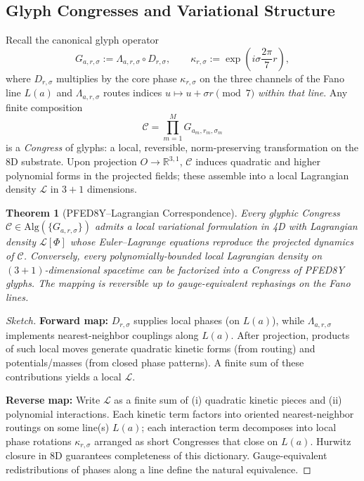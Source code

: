 \documentclass[pdflatex,sn-mathphys-num]{sn-jnl}
\theoremstyle{thmstyleone}
\newtheorem{theorem}{Theorem}
\theoremstyle{thmstyletwo}
\theoremstyle{thmstylethree}
\begin{document}
\subsection{Glyph Congresses and Variational Structure}

Recall the canonical glyph operator
\begin{equation}
    G_{a,r,\sigma} := \Lambda_{a,r,\sigma} \circ D_{r,\sigma}, \qquad
    \kappa_{r,\sigma} := \exp\left(i\sigma\frac{2\pi}{7}r\right),
\end{equation}
where $D_{r,\sigma}$ multiplies by the core phase $\kappa_{r,\sigma}$ on the three channels of the Fano line $L(a)$ and $\Lambda_{a,r,\sigma}$ routes indices $u \mapsto u + \sigma r \pmod{7}$ \emph{within that line}. Any finite composition
\begin{equation}
    \mathcal{C} = \prod_{m=1}^{M} G_{a_m,r_m,\sigma_m}
\end{equation}
is a \emph{Congress} of glyphs: a local, reversible, norm-preserving transformation on the 8D substrate. Upon projection $O \to \mathbb{R}^{3,1}$, $\mathcal{C}$ induces quadratic and higher polynomial forms in the projected fields; these assemble into a local Lagrangian density $\mathcal{L}$ in $3+1$ dimensions.

\begin{theorem}[PFED8Y--Lagrangian Correspondence]
\label{thm:correspondence}
Every glyphic Congress $\mathcal{C} \in \mathrm{Alg}(\{G_{a,r,\sigma}\})$ admits a local variational formulation in 4D with Lagrangian density $\mathcal{L}[\Phi]$ whose Euler--Lagrange equations reproduce the projected dynamics of $\mathcal{C}$. Conversely, every polynomially-bounded local Lagrangian density on $(3+1)$-dimensional spacetime can be factorized into a Congress of PFED8Y glyphs. The mapping is reversible up to gauge-equivalent rephasings on the Fano lines.
\end{theorem}

\begin{proof}[Sketch]
\textbf{Forward map:} $D_{r,\sigma}$ supplies local phases (on $L(a)$), while $\Lambda_{a,r,\sigma}$ implements nearest-neighbor couplings along $L(a)$. After projection, products of such local moves generate quadratic kinetic forms (from routing) and potentials/masses (from closed phase patterns). A finite sum of these contributions yields a local $\mathcal{L}$.

\textbf{Reverse map:} Write $\mathcal{L}$ as a finite sum of (i) quadratic kinetic pieces and (ii) polynomial interactions. Each kinetic term factors into oriented nearest-neighbor routings on some line(s) $L(a)$; each interaction term decomposes into local phase rotations $\kappa_{r,\sigma}$ arranged as short Congresses that close on $L(a)$. Hurwitz closure in 8D guarantees completeness of this dictionary. Gauge-equivalent redistributions of phases along a line define the natural equivalence.
\end{proof}
\end{document}
